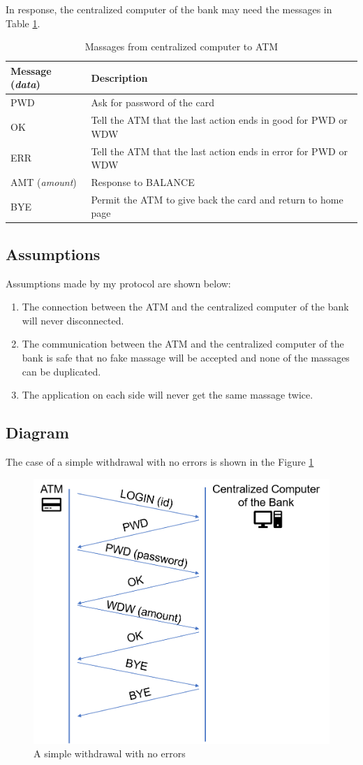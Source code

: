 \documentclass[a4paper, 11pt]{article}
\begin{document}
In response, the centralized computer of the bank may need the messages in Table \ref{tab:cc}.
\begin{table}[htbp]
	\centering
	\caption{Massages from centralized computer to ATM}
	\label{tab:cc}
	\begin{tabular}{@{}ll@{}}
		\toprule
		Message (\textit{data}) & Description                                                     \\ \midrule
		PWD                     & Ask for password of the card                                 \\
		OK                      & Tell the ATM that the last action ends in good for PWD or WDW  \\
		ERR                     & Tell the ATM that the last action ends in error for PWD or WDW \\
		AMT (\textit{amount})   & Response to BALANCE                                          \\
		BYE                     & Permit the ATM to give back the card and return to home page \\ \bottomrule
	\end{tabular}
\end{table}

\subsection*{Assumptions}
Assumptions made by my protocol are shown below:
\begin{enumerate}
    \item The connection between the ATM and the centralized computer of the bank will never disconnected.
    \item The communication between the ATM and the centralized computer of the bank is safe that no fake massage will be accepted and none of the massages can be duplicated.
    \item The application on each side will never get the same massage twice.
\end{enumerate}
\newpage
\subsection*{Diagram}
The case of a simple withdrawal with no errors is shown in the Figure \ref{fig:com}
\begin{figure}[htbp]
    \centering
    \includegraphics[width=.6\linewidth]{./communication.png}
    \caption{A simple withdrawal with no errors}
    \label{fig:com}
\end{figure}
\end{document}

